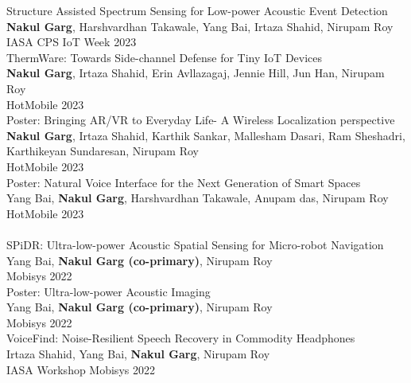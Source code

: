 \documentclass[10pt]{article}
\begin{document}

Structure Assisted Spectrum Sensing for Low-power Acoustic Event Detection\\
\textbf{Nakul Garg}, Harshvardhan Takawale, Yang Bai, Irtaza Shahid, Nirupam Roy\\
IASA CPS IoT Week 2023\\

ThermWare: Towards Side-channel Defense for Tiny IoT Devices\\
\textbf{Nakul Garg}, Irtaza Shahid, Erin Avllazagaj, Jennie Hill, Jun Han, Nirupam Roy\\
HotMobile 2023\\

Poster: Bringing AR/VR to Everyday Life- A Wireless Localization perspective\\
\textbf{Nakul Garg}, Irtaza Shahid, Karthik Sankar, Mallesham Dasari, Ram Sheshadri, Karthikeyan Sundaresan, Nirupam Roy\\
HotMobile 2023\\

Poster: Natural Voice Interface for the Next Generation of Smart Spaces\\
Yang Bai, \textbf{Nakul Garg}, Harshvardhan Takawale, Anupam das, Nirupam Roy\\
HotMobile 2023\\
\\

SPiDR: Ultra-low-power Acoustic Spatial Sensing for Micro-robot Navigation\\
Yang Bai, \textbf{Nakul Garg (co-primary)}, Nirupam Roy\\
Mobisys 2022\\

Poster: Ultra-low-power Acoustic Imaging\\
Yang Bai, \textbf{Nakul Garg (co-primary)}, Nirupam Roy\\
Mobisys 2022\\

VoiceFind: Noise-Resilient Speech Recovery in Commodity Headphones\\
Irtaza Shahid, Yang Bai, \textbf{Nakul Garg}, Nirupam Roy\\
IASA Workshop Mobisys 2022\\
\end{document}
